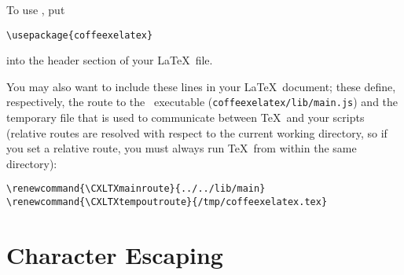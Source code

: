 \documentclass[a4paper]{article}
\makeatletter
\newenvironment{jzrplain}{%
  \lineskiplimit=-10pt%
  \lineskip=0pt%
  \topskip=0pt%
  \setlength{\parskip}{4mm}%
  \setlength{\parindent}{0mm}%
  \leading{4mm}
  }%
  {\par}
\renewcommand{\CXLTXmainroute}{../../lib/main}
\renewcommand{\CXLTXtempoutroute}{/tmp/CXLTXtempout.tex}
\makeatother
\begin{document}
\begin{jzrplain}
To use \CXLTX, put
\begin{verbatim}
\usepackage{coffeexelatex}
\end{verbatim}
into the header section of your \LaTeX\ file.

You may also want to include these lines in your \LaTeX\ document; these define, respectively, the route
to the \CXLTX\ executable (\verb#coffeexelatex/lib/main.js#) and the temporary file that is used to communicate
between \TeX\ and your scripts (relative routes are resolved with respect to the current working directory,
so if you set a relative route, you must always run \TeX\ from within the same directory):
\begin{verbatim}
\renewcommand{\CXLTXmainroute}{../../lib/main}
\renewcommand{\CXLTXtempoutroute}{/tmp/coffeexelatex.tex}
\end{verbatim}










\clearpage\section{Character Escaping}\label{esc}


\end{jzrplain}
\end{document}

